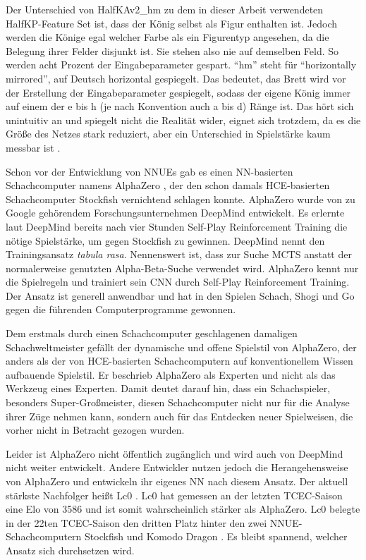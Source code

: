 Der Unterschied von HalfKAv2\_hm zu dem in dieser Arbeit verwendeten HalfKP-Feature Set ist, dass der König selbst als Figur enthalten ist. Jedoch werden die Könige egal welcher Farbe als ein Figurentyp angesehen, da die Belegung ihrer Felder disjunkt ist. Sie stehen also nie auf demselben Feld. So werden acht Prozent der Eingabeparameter gespart. \enquote{hm} steht für \enquote{horizontally mirrored}, auf Deutsch horizontal gespiegelt. Das bedeutet, das Brett wird vor der Erstellung der Eingabeparameter gespiegelt, sodass der eigene König immer auf einem der e bis h (je nach Konvention auch a bis d) Ränge ist. Das hört sich unintuitiv an und spiegelt nicht die Realität wider, eignet sich trotzdem, da es die Größe des Netzes stark reduziert, aber ein Unterschied in Spielstärke kaum messbar ist \cite{StockfishNNUE}.

Schon vor der Entwicklung von \acp{NNUE} gab es einen \ac{NN}-basierten Schachcomputer namens AlphaZero \cite{Silver2017}, der den schon damals \ac{HCE}-basierten Schachcomputer Stockfish vernichtend schlagen konnte. AlphaZero wurde \citeyear{Silver2017} von zu Google gehörendem Forschungsunternehmen DeepMind entwickelt. Es erlernte laut DeepMind bereits nach vier Stunden Self-Play Reinforcement Training die nötige Spielstärke, um gegen Stockfish zu gewinnen. DeepMind nennt den Trainingsansatz \emph{tabula rasa}. Nennenswert ist, dass zur Suche \ac{MCTS} anstatt der normalerweise genutzten Alpha-Beta-Suche verwendet wird. AlphaZero kennt nur die Spielregeln und trainiert sein \ac{CNN} durch Self-Play Reinforcement Training. Der Ansatz ist generell anwendbar und hat in den Spielen Schach, Shogi und Go gegen die führenden Computerprogramme gewonnen.

Dem erstmals durch einen Schachcomputer geschlagenen damaligen Schachweltmeister \citeauthor{Kasparov2018} \cite{Kasparov2018} gefällt der dynamische und offene Spielstil von AlphaZero, der anders als der von \ac{HCE}-basierten Schachcomputern auf konventionellem Wissen aufbauende Spielstil. Er beschrieb AlphaZero als Experten und nicht als das Werkzeug eines Experten. Damit deutet \citeauthor{Kasparov2018} darauf hin, dass ein Schachspieler, besonders Super-Großmeister, diesen Schachcomputer nicht nur für die Analyse ihrer Züge nehmen kann, sondern auch für das Entdecken neuer Spielweisen, die vorher nicht in Betracht gezogen wurden.

Leider ist AlphaZero nicht öffentlich zugänglich und wird auch von DeepMind nicht weiter entwickelt. Andere Entwickler nutzen jedoch die Herangehensweise von AlphaZero und entwickeln ihr eigenes \ac{NN} nach diesem Ansatz. Der aktuell stärkste Nachfolger heißt \ac{Lc0} \cite{Lc0Homepage}. \ac{Lc0} hat gemessen an der letzten \ac{TCEC}-Saison eine Elo von 3586 \cite{TCEC22} und ist somit wahrscheinlich stärker als AlphaZero. \ac{Lc0} belegte in der 22ten \ac{TCEC}-Saison den dritten Platz hinter den zwei \ac{NNUE}-Schachcomputern Stockfish und Komodo Dragon \cite{KomodoDragon}. Es bleibt spannend, welcher Ansatz sich durchsetzen wird.